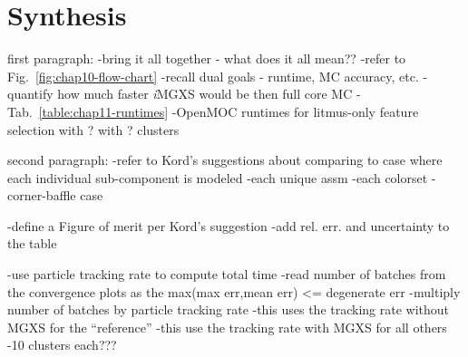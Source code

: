 \section{Synthesis}
\label{sec:chap11-synthesis}

first paragraph:
-bring it all together - what does it all mean??
  -refer to Fig.~\ref{fig:chap10-flow-chart}
  -recall dual goals - runtime, MC accuracy, etc.
-quantify how much faster \textit{i}\ac{MGXS} would be then full core MC
  -Tab.~\ref{table:chap11-runtimes}
-OpenMOC runtimes for litmus-only feature selection with ? with ? clusters

second paragraph:
-refer to Kord's suggestions about comparing to case where each individual sub-component is modeled
 -each unique assm
 -each colorset
 -corner-baffle case

-define a Figure of merit per Kord's suggestion
-add rel. err. and uncertainty to the table


-use particle tracking rate to compute total time
  -read number of batches from the convergence plots as the max(max err,mean err) <= degenerate err
  -multiply number of batches by particle tracking rate
  -this uses the tracking rate without MGXS for the ``reference''
  -this use the tracking rate with MGXS for all others
  -10 clusters each???

